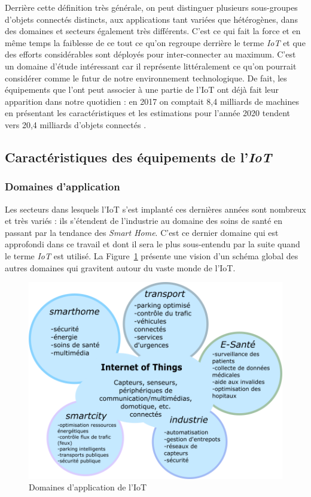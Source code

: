 \documentclass[]{article}
\begin{document}
\par Derrière cette définition très générale, on peut distinguer plusieurs sous-groupes d'objets connectés distincts, aux applications tant variées que hétérogènes, dans des domaines et secteurs également très différents. C'est ce qui fait la force et en même temps la faiblesse de ce tout ce qu'on regroupe derrière le terme \textit{IoT} et que des efforts considérables sont déployés pour inter-connecter au maximum. C'est un domaine d'étude intéressant car il représente littéralement ce qu'on pourrait considérer comme le futur de notre environnement technologique. De fait, les équipements que l'ont peut associer à une partie de l'IoT ont déjà fait leur apparition dans notre quotidien : en 2017 on comptait 8,4 milliards de machines en présentant les caractéristiques et les estimations pour l'année 2020 tendent vers 20,4 milliards d'objets connectés \cite{Berte2018}.  
\subsection{Caractéristiques des équipements de l'\textit{IoT}}

\subsubsection{Domaines d'application}

Les secteurs dans lesquels l'IoT s'est implanté ces dernières années sont nombreux et très variés : ils s'étendent de l'industrie au domaine des soins de santé en passant par la tendance des \textit{Smart Home}. C'est ce dernier domaine qui est approfondi dans ce travail et dont il sera le plus sous-entendu par la suite quand le terme \textit{IoT} est utilisé. La Figure~\ref{domains_IoT} présente une vision d'un schéma global des autres domaines qui gravitent autour du vaste monde de l'IoT.\\


\begin{figure}[!h]
\centering
\includegraphics[width=0.6\linewidth]{IoT_domains.png}
\caption{Domaines d'application de l'IoT}
\label{domains_IoT}
\end{figure}
\end{document}
